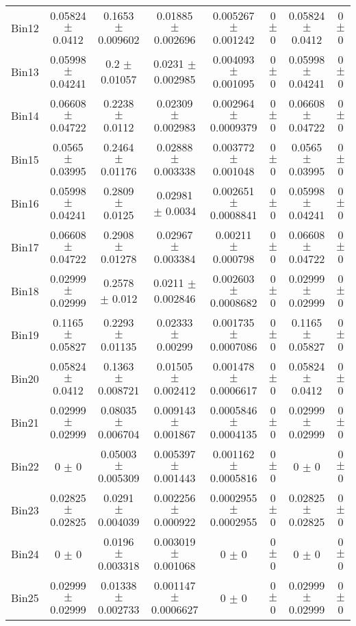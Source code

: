 \begin{tabular}{@{\extracolsep{4pt}}lccccccc@{}}
     Bin12 & 0.05824 $\pm$ 0.0412 & 0.1653 $\pm$ 0.009602 & 0.01885 $\pm$ 0.002696 & 0.005267 $\pm$ 0.001242 & 0 $\pm$ 0 & 0.05824 $\pm$ 0.0412 & 0 $\pm$ 0 \\ 
     Bin13 & 0.05998 $\pm$ 0.04241 & 0.2 $\pm$ 0.01057 & 0.0231 $\pm$ 0.002985 & 0.004093 $\pm$ 0.001095 & 0 $\pm$ 0 & 0.05998 $\pm$ 0.04241 & 0 $\pm$ 0 \\ 
     Bin14 & 0.06608 $\pm$ 0.04722 & 0.2238 $\pm$ 0.0112 & 0.02309 $\pm$ 0.002983 & 0.002964 $\pm$ 0.0009379 & 0 $\pm$ 0 & 0.06608 $\pm$ 0.04722 & 0 $\pm$ 0 \\ 
     Bin15 & 0.0565 $\pm$ 0.03995 & 0.2464 $\pm$ 0.01176 & 0.02888 $\pm$ 0.003338 & 0.003772 $\pm$ 0.001048 & 0 $\pm$ 0 & 0.0565 $\pm$ 0.03995 & 0 $\pm$ 0 \\ 
     Bin16 & 0.05998 $\pm$ 0.04241 & 0.2809 $\pm$ 0.0125 & 0.02981 $\pm$ 0.0034 & 0.002651 $\pm$ 0.0008841 & 0 $\pm$ 0 & 0.05998 $\pm$ 0.04241 & 0 $\pm$ 0 \\ 
     Bin17 & 0.06608 $\pm$ 0.04722 & 0.2908 $\pm$ 0.01278 & 0.02967 $\pm$ 0.003384 & 0.00211 $\pm$ 0.000798 & 0 $\pm$ 0 & 0.06608 $\pm$ 0.04722 & 0 $\pm$ 0 \\ 
     Bin18 & 0.02999 $\pm$ 0.02999 & 0.2578 $\pm$ 0.012 & 0.0211 $\pm$ 0.002846 & 0.002603 $\pm$ 0.0008682 & 0 $\pm$ 0 & 0.02999 $\pm$ 0.02999 & 0 $\pm$ 0 \\ 
     Bin19 & 0.1165 $\pm$ 0.05827 & 0.2293 $\pm$ 0.01135 & 0.02333 $\pm$ 0.00299 & 0.001735 $\pm$ 0.0007086 & 0 $\pm$ 0 & 0.1165 $\pm$ 0.05827 & 0 $\pm$ 0 \\ 
     Bin20 & 0.05824 $\pm$ 0.0412 & 0.1363 $\pm$ 0.008721 & 0.01505 $\pm$ 0.002412 & 0.001478 $\pm$ 0.0006617 & 0 $\pm$ 0 & 0.05824 $\pm$ 0.0412 & 0 $\pm$ 0 \\ 
     Bin21 & 0.02999 $\pm$ 0.02999 & 0.08035 $\pm$ 0.006704 & 0.009143 $\pm$ 0.001867 & 0.0005846 $\pm$ 0.0004135 & 0 $\pm$ 0 & 0.02999 $\pm$ 0.02999 & 0 $\pm$ 0 \\ 
     Bin22 & 0 $\pm$ 0 & 0.05003 $\pm$ 0.005309 & 0.005397 $\pm$ 0.001443 & 0.001162 $\pm$ 0.0005816 & 0 $\pm$ 0 & 0 $\pm$ 0 & 0 $\pm$ 0 \\ 
     Bin23 & 0.02825 $\pm$ 0.02825 & 0.0291 $\pm$ 0.004039 & 0.002256 $\pm$ 0.000922 & 0.0002955 $\pm$ 0.0002955 & 0 $\pm$ 0 & 0.02825 $\pm$ 0.02825 & 0 $\pm$ 0 \\ 
     Bin24 & 0 $\pm$ 0 & 0.0196 $\pm$ 0.003318 & 0.003019 $\pm$ 0.001068 & 0 $\pm$ 0 & 0 $\pm$ 0 & 0 $\pm$ 0 & 0 $\pm$ 0 \\ 
     Bin25 & 0.02999 $\pm$ 0.02999 & 0.01338 $\pm$ 0.002733 & 0.001147 $\pm$ 0.0006627 & 0 $\pm$ 0 & 0 $\pm$ 0 & 0.02999 $\pm$ 0.02999 & 0 $\pm$ 0 \\ 

\end{tabular}
